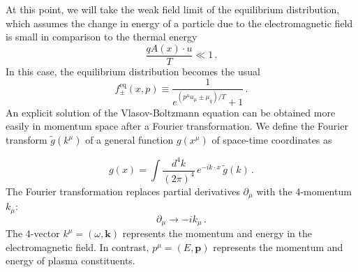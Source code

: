 At this point, we will take the weak field limit of the equilibrium distribution, which assumes the change in energy of a particle due to the electromagnetic field is small in comparison to the thermal energy
\begin{equation}
    \frac{ qA(x)\cdot u}{T}\ll 1\,.
\end{equation}
In this case, the equilibrium distribution becomes the usual
\begin{equation}\label{eq:equilibriumFD}
f^\mathrm{eq}_\pm(x,p) \equiv \frac{1}{e^{(p^{\mu}  u_\mu\pm \mu_q)/T} + 1}\,.
\end{equation}
An explicit solution of the Vlasov-Boltzmann equation can be obtained more easily in momentum space after a Fourier transformation.  We define the Fourier transform $\widetilde{g}(k^\mu)$ of a general function $g(x^\mu)$ of space-time coordinates as 

\begin{equation}\label{eq:ftdef}
g(x) = \int \frac{d^4k}{(2\pi)^4} \, e^{-i k \cdot x} \, \widetilde{g}(k)\,.
\end{equation} 
The Fourier transformation replaces partial derivatives $\partial_\mu$ with the 4-momentum $k_\mu$:
\begin{equation}
\partial_\mu \rightarrow - i k_\mu \,.
\end{equation}
The 4-vector $k^\mu = (\omega,\mathbf{k})$ represents the momentum and energy in the electromagnetic field. In contrast, $p^{\mu}  = (E,\boldsymbol{p})$ represents the momentum and energy of plasma constituents.

